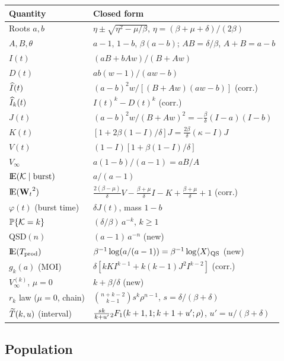 \begin{center}
\renewcommand{\arraystretch}{1.3}
\small
\begin{tabular}{@{}p{}p{}@{}}
\toprule
Quantity & Closed form \\
\midrule
Roots $a,b$ & $\eta\pm\sqrt{\eta^2-\mu/\beta}$, $\eta=(\beta+\mu+\delta)/(2\beta)$ \\
$A,B,\theta$ & $a-1$, $1-b$, $\beta(a-b)$; $AB=\delta/\beta$, $A+B=a-b$ \\
$I(t)$ & $(aB+bAw)/(B+Aw)$ \\
$D(t)$ & $ab(w-1)/(aw-b)$ \\
$\widehat{I}(t)$ & $(a-b)^2 w/[(B+Aw)(aw-b)]$ \quad(corr.) \\
$\widehat{I}_k(t)$ & $I(t)^k-D(t)^k$ \quad(corr.) \\
$J(t)$ & $(a-b)^2 w/(B+Aw)^2=-\frac{\beta}{\delta}(I-a)(I-b)$ \\
$K(t)$ & $[1+2\beta(1-I)/\delta]J=\frac{2\beta}{\delta}(\kappa-I)J$ \\
$V(t)$ & $(1-I)[1+\beta(1-I)/\delta]$ \\
$V_\infty$ & $a(1-b)/(a-1)=aB/A$ \\
${\rm I}\!{\rm E}(\mathcal{K}\mid\text{burst})$ & $a/(a-1)$ \\
${\rm I}\!{\rm E}({{\bf W}_t}^2)$ & $\frac{2(\beta-\mu)}{\delta}V-\frac{\beta+\mu}{\delta}I-K+\frac{\beta+\mu}{\delta}+1$ \quad(corr.) \\
$\varphi(t)$ (burst time) & $\delta J(t)$, mass $1-b$ \\
$\mathbb{P}\!\left\{\mathcal{K}=k\right\}$ & $(\delta/\beta)\,a^{-k}$, $k\ge1$ \\
QSD$(n)$ & $(a-1)\,a^{-n}$ \quad(new) \\
${\rm I}\!{\rm E}(T_{\rm prod})$ & $\beta^{-1}\log(a/(a-1))=\beta^{-1}\log\langle X\rangle_{\rm QS}$ \quad(new) \\
$g_k(a)$ (MOI) & $\delta[kK I^{k-1}+k(k-1)J^2I^{k-2}]$ \quad(corr.) \\
$V_\infty^{(k)}$, $\mu=0$ & $k+\beta/\delta$ \quad(new) \\
$r_k$ law ($\mu=0$, chain) & $\binom{n+k-2}{k-1}s^k\rho^{n-1}$, $s=\delta/(\beta+\delta)$ \\
$\widetilde{T}(k,u)$ (interval) & $\frac{sk}{k+u'}{}_2F_1(k+1,1;k+1+u';\rho)$, $u'=u/(\beta+\delta)$ \\
\bottomrule
\end{tabular}
\end{center}

\subsection*{Population}

